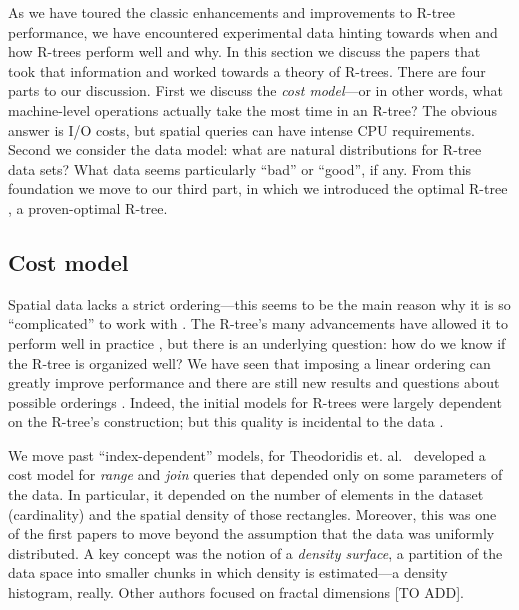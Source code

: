 As we have toured the classic enhancements and improvements to R-tree performance, we have encountered experimental data hinting towards when and how R-trees perform well and why.
In this section we discuss the papers that took that information and worked towards a theory of R-trees.
There are four parts to our discussion.
First we discuss the \emph{cost model}---or in other words, what machine-level operations actually take the most time in an R-tree?
The obvious answer is I/O costs, but spatial queries can have intense CPU requirements.
Second we consider the data model: what are natural distributions for R-tree data sets?
What data seems particularly ``bad'' or ``good'', if any.
From this foundation we move to our third part, in which we introduced the optimal R-tree \cite{argeberghaverkortyi04}, a proven-optimal R-tree.

\subsection{Cost model}
Spatial data lacks a strict ordering---this seems to be the main reason why it is so ``complicated'' to work with \cite{stuff}.
The R-tree's many advancements have allowed it to perform well in practice \cite{thebook}, but there is an underlying question: how do we know if the R-tree is organized well?
We have seen that imposing a linear ordering can greatly improve performance \cite{kamelfaloutsos94} and there are still new results and questions about possible orderings \cite{haverkortwalderveen11}.
Indeed, the initial models for R-trees were largely dependent on the R-tree's construction; but this quality is incidental to the data \cite{see:list:in:theodoridisstefanakissellis}.

We move past ``index-dependent'' models, for Theodoridis et. al.\ \cite{theodoridissellis96,theodoridisstefanakissellis00} developed a cost model for \emph{range} and \emph{join} queries that depended only on some parameters of the data.
In particular, it depended on the number of elements in the dataset (cardinality) and the spatial density of those rectangles.
Moreover, this was one of the first papers to move beyond the assumption that the data was uniformly distributed.
A key concept was the notion of a \emph{density surface}, a partition of the data space into smaller chunks in which density is estimated---a density histogram, really.
Other authors focused on fractal dimensions [TO ADD].

